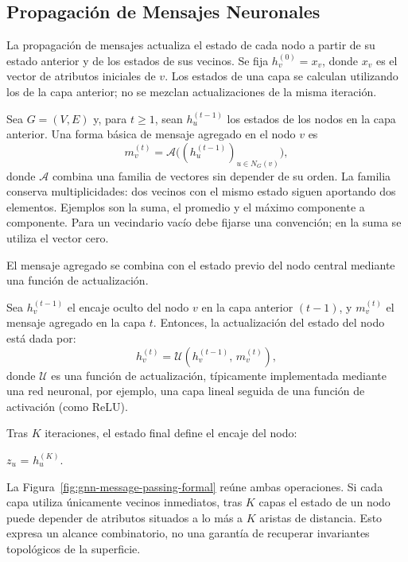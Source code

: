 \subsection{Propagación de Mensajes Neuronales}
La propagación de mensajes actualiza el estado de cada nodo a partir de su estado anterior y de los estados de sus vecinos. Se fija $h_v^{(0)}=x_v$, donde $x_v$ es el vector de atributos iniciales de $v$. Los estados de una capa se calculan utilizando los de la capa anterior; no se mezclan actualizaciones de la misma iteración.

\begin{definition}
\label{def:propagacion-mensajes}
Sea $G=(V,E)$ y, para $t\geq1$, sean $h_u^{(t-1)}$ los estados de los nodos en la capa anterior. Una forma básica de mensaje agregado en el nodo $v$ es
\[
m_v^{(t)}=\mathscr A\bigl((h_u^{(t-1)})_{u\in N_G(v)}\bigr),
\]
donde $\mathscr A$ combina una familia de vectores sin depender de su orden. La familia conserva multiplicidades: dos vecinos con el mismo estado siguen aportando dos elementos. Ejemplos son la suma, el promedio y el máximo componente a componente. Para un vecindario vacío debe fijarse una convención; en la suma se utiliza el vector cero.
\end{definition}

El mensaje agregado se combina con el estado previo del nodo central mediante una función de actualización.

\begin{definition}
\label{def:actualizacion-estados}
    Sea $h_v^{(t-1)}$ el encaje oculto del nodo $v$ en la capa anterior $(t-1)$, y $m_v^{(t)}$ el mensaje agregado en la capa $t$. Entonces, la actualización del estado del nodo está dada por:
    \[
        h_v^{(t)} = \mathscr{U}\!\left(h_v^{(t-1)},\, m_v^{(t)}\right),
    \]
    donde $\mathscr{U}$ es una función de actualización, típicamente implementada mediante una red neuronal, por ejemplo, una capa lineal seguida de una función de activación (como ReLU).
\end{definition}

Tras $K$ iteraciones, el estado final define el encaje del nodo:

\begin{center}
    $z_u$ = $h_u^{(K)}$.
\end{center}

La Figura~\ref{fig:gnn-message-passing-formal} reúne ambas operaciones. Si cada capa utiliza únicamente vecinos inmediatos, tras $K$ capas el estado de un nodo puede depender de atributos situados a lo más a $K$ aristas de distancia. Esto expresa un alcance combinatorio, no una garantía de recuperar invariantes topológicos de la superficie.

